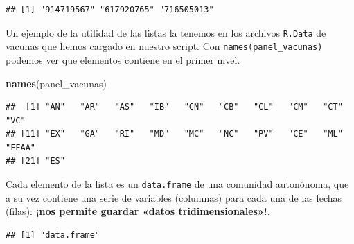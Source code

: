 \documentclass[11pt,]{book}
\newenvironment{Shaded}{\begin{snugshade}}{\end{snugshade}}
\newcommand{\KeywordTok}[1]{\textcolor[rgb]{0.27,0.27,0.27}{\textbf{#1}}}
\newcommand{\NormalTok}[1]{#1}
\newcommand{\OperatorTok}[1]{\textcolor[rgb]{0.43,0.43,0.43}{\textbf{#1}}}
\begin{document}
\begin{verbatim}
## [1] "914719567" "617920765" "716505013"
\end{verbatim}

Un ejemplo de la utilidad de las listas la tenemos en los archivos \texttt{R.Data} de vacunas que hemos cargado en nuestro script. Con \texttt{names(panel\_vacunas)} podemos ver que elementos contiene en el primer nivel.

\begin{Shaded}
\begin{Highlighting}[]
\KeywordTok{names}\NormalTok{(panel_vacunas)}
\end{Highlighting}
\end{Shaded}

\begin{verbatim}
##  [1] "AN"   "AR"   "AS"   "IB"   "CN"   "CB"   "CL"   "CM"   "CT"   "VC"  
## [11] "EX"   "GA"   "RI"   "MD"   "MC"   "NC"   "PV"   "CE"   "ML"   "FFAA"
## [21] "ES"
\end{verbatim}

Cada elemento de la lista es un \texttt{data.frame} de una comunidad autonónoma, que a su vez contiene una serie de variables (columnas) para cada una de las fechas (filas): \textbf{¡nos permite guardar «datos tridimensionales»!}.

\begin{Shaded}
\end{Shaded}

\begin{verbatim}
## [1] "data.frame"
\end{verbatim}

\begin{Shaded}
\end{Shaded}
\end{document}
